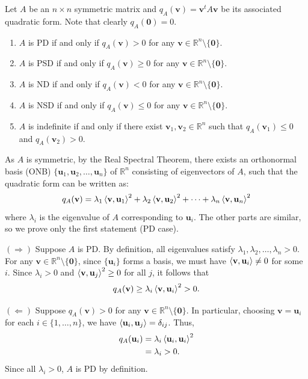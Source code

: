\begin{theorem}
	Let $A$ be an $n \times n$ symmetric matrix and $q_A(\mathbf{v}) = \mathbf{v}^t A \mathbf{v}$ be its associated quadratic form. Note that clearly $q_A(\mathbf{0}) = 0$.
	\begin{enumerate}
		\item $A$ is PD if and only if $q_A(\mathbf{v}) > 0$ for any $\mathbf{v} \in \mathbb{R}^n \setminus \{\mathbf{0}\}$.
		\item $A$ is PSD if and only if $q_A(\mathbf{v}) \ge 0$ for any $\mathbf{v} \in \mathbb{R}^n \setminus \{\mathbf{0}\}$.
		\item $A$ is ND if and only if $q_A(\mathbf{v}) < 0$ for any $\mathbf{v} \in \mathbb{R}^n \setminus \{\mathbf{0}\}$.
		\item $A$ is NSD if and only if $q_A(\mathbf{v}) \le 0$ for any $\mathbf{v} \in \mathbb{R}^n \setminus \{\mathbf{0}\}$.
		\item $A$ is indefinite if and only if there exist $\mathbf{v}_1, \mathbf{v}_2 \in \mathbb{R}^n$ such that $q_A(\mathbf{v}_1) \le 0$ and $q_A(\mathbf{v}_2) > 0$.
	\end{enumerate}
\end{theorem}

\begin{pfbox}
	As $A$ is symmetric, by the Real Spectral Theorem, there exists an orthonormal basis (ONB) $\{\mathbf{u}_1, \mathbf{u}_2, \dots, \mathbf{u}_n\}$ of $\mathbb{R}^n$ consisting of eigenvectors of $A$, such that the quadratic form can be written as:
	$$
		q_A(\mathbf{v}) = \lambda_1 \left\langle \mathbf{v}, \mathbf{u}_1 \right\rangle^2 + \lambda_2 \left\langle \mathbf{v}, \mathbf{u}_2 \right\rangle^2 + \dots + \lambda_n \left\langle \mathbf{v}, \mathbf{u}_n \right\rangle^2
	$$
	where $\lambda_i$ is the eigenvalue of $A$ corresponding to $\mathbf{u}_i$. The other parts are similar, so we prove only the first statement (PD case).

	$(\Rightarrow)$ Suppose $A$ is PD. By definition, all eigenvalues satisfy $\lambda_1, \lambda_2, \dots, \lambda_n > 0$. For any $\mathbf{v} \in \mathbb{R}^n \setminus \{\mathbf{0}\}$, since $\{\mathbf{u}_i\}$ forms a basis, we must have $\left\langle \mathbf{v}, \mathbf{u}_i \right\rangle \ne 0$ for some $i$. Since $\lambda_i > 0$ and $\left\langle \mathbf{v}, \mathbf{u}_j \right\rangle^2 \ge 0$ for all $j$, it follows that
	$$
		q_A(\mathbf{v}) \ge \lambda_i \left\langle \mathbf{v}, \mathbf{u}_i \right\rangle^2 > 0.
	$$

	$(\Leftarrow)$ Suppose $q_A(\mathbf{v}) > 0$ for any $\mathbf{v} \in \mathbb{R}^n \setminus \{\mathbf{0}\}$. In particular, choosing $\mathbf{v} = \mathbf{u}_i$ for each $i \in \{1, \dots, n\}$, we have $\left\langle \mathbf{u}_i, \mathbf{u}_j \right\rangle = \delta_{ij}$. Thus,
	\begin{align*}
		q_A(\mathbf{u}_i)
		 & = \lambda_i \left\langle \mathbf{u}_i, \mathbf{u}_i \right\rangle^2 \\
		 & = \lambda_i>0.
	\end{align*}
	Since all $\lambda_i > 0$, $A$ is PD by definition.
\end{pfbox}






